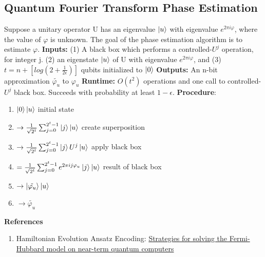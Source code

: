 \documentclass{article}
\begin{document}
\subsection*{Quantum Fourier Transform Phase Estimation}
Suppose a unitary operator U has an eigenvalue $\ket{u}$ with 
eigenvalue $e^{2 \pi i \varphi}$, where the value of 
$\varphi$ is unknown. The goal of the 
phase estimation algorithm is to estimate $\varphi$.
\newline
\textbf{Inputs:} (1) A black box which performs a 
controlled-$U^j$ operation, for integer j. (2) an 
eigenstate $\ket{u}$ of U with eigenvalue $e^{2 \pi i \varphi}$, and 
(3) $t = n + [log(2+\frac{1}{2 \epsilon})]$ qubits initialized 
to $\ket{0}$ \newline
\textbf{Outputs:} An n-bit approximation $\tilde{\varphi_u}$ to $\varphi_u$ \newline
\textbf{Runtime:} $O(t^2)$ operations and one call to controlled-$U^j$
black box. Succeeds with probability at least $1-\epsilon$. \newline
\textbf{Procedure}: 
\begin{enumerate}
  \item $\ket{0}\ket{u}$  initial state
  \item $\rightarrow \frac{1}{\sqrt{2^t}} \sum^{2^t -1}_{j=0} \ket{j}\ket{u} $ create superposition
  \item $\rightarrow \frac{1}{\sqrt{2^t}} \sum^{2^t -1}_{j=0} \ket{j} U^j \ket{u} $ apply black box
  \item $= \frac{1}{\sqrt{2^t}} \sum^{2^t -1}_{j=0}  e^{2 \pi i j \varphi_u} \ket{j} \ket{u} $ result of black box 
  \item $\rightarrow \ket{\tilde{\varphi_u}} \ket{u}$
  \item  $\rightarrow \tilde{\varphi_u}$
\end{enumerate}

\textbf{References}
\begin{enumerate}
  \item Hamiltonian Evolution Ansatz Encoding: \href{https://journals.aps.org/prb/abstract/10.1103/PhysRevB.102.235122}{Strategies for solving the Fermi-Hubbard model on near-term quantum computers}
\end{enumerate}
\end{document}
